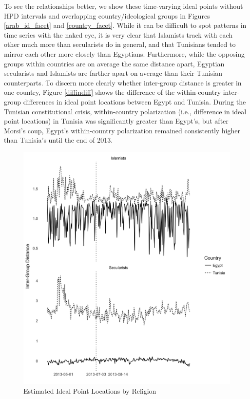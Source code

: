 \documentclass[12pt]{article}
\begin{document}
 To see the relationships better, we show these time-varying ideal points without HPD intervals and overlapping country/ideological groups in Figures \ref{arab_id_facet} and \ref{country_facet}. While it can be difficult to spot patterns in time series with the naked eye, it is very clear that Islamists track with each other much more than secularists do in general, and that Tunisians tended to mirror each other more closely than Egyptians. Furthermore, while the opposing groups within countries are on average the same distance apart, Egyptian secularists and Islamists are farther apart on average than their Tunisian counterparts. To discern more clearly whether inter-group distance is greater in one country, Figure \ref{diffindiff} shows the difference of the within-country inter-group differences in ideal point locations between Egypt and Tunisia. During the Tunisian constitutional crisis, within-country polarization (i.e., difference in ideal point locations) in Tunisia was significantly greater than Egypt's, but after Morsi's coup, Egypt's within-country polarization remained consistently higher than Tunisia's until the end of 2013.
 \begin{figure}[!h]
 	\centering
	\caption{Estimated Ideal Point Locations by Religion}\label{religion_facet}
	\centering
	\includegraphics[width=.9\linewidth]{religion_coint}
\end{figure}
\end{document}
